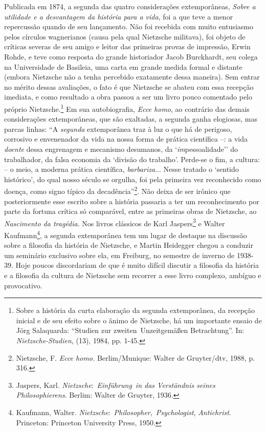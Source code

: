 \label{introduuxe7uxe3o}

Publicada em 1874, a segunda das quatro considerações extemporâneas,
\emph{Sobre a utilidade e a desvantagem da história para a vida}, foi a
que teve a menor repercussão quando de seu lançamento. Não foi recebida
com muito entusiasmo pelos círculos wagnerianos (causa pela qual
Nietzsche militava), foi objeto de críticas severas de seu amigo e
leitor das primeiras provas de impressão, Erwin Rohde, e teve como
resposta do grande historiador Jacob Burckhardt, seu colega na
Universidade de Basileia, uma carta em grande medida formal e distante
(embora Nietzsche não a tenha percebido exatamente dessa maneira). Sem
entrar no mérito dessas avaliações, o fato é que Nietzsche se abateu com
essa recepção imediata, e como resultado a obra passou a ser um livro
pouco comentado pelo próprio Nietzsche.\footnote{Sobre a história da
  curta elaboração da segunda extemporânea, da recepção inicial e de seu
  efeito sobre o ânimo de Nietzsche, há um importante ensaio de Jörg
  Salaquarda: ``Studien zur zweiten~Unzeitgemäßen Betrachtung''. In:
  \emph{Nietzsche-Studien}, (13), 1984, pp. 1-45.} Em sua autobiografia,
\emph{Ecce homo}, ao contrário das demais considerações extemporâneas,
que são exaltadas, a segunda ganha elogiosas, mas parcas linhas: ``A
\emph{segunda} extemporânea traz à luz o que há de perigoso, corrosivo e
envenenador da vida na nossa forma de prática científica --: a vida
\emph{doente} dessa engrenagem e mecanismo desumanos, da
`\emph{im}pessoalidade'' do trabalhador, da falsa economia da `divisão
do trabalho'. Perde-se o fim, a cultura: -- o meio, a moderna prática
científica, \emph{barbariza}... Nesse tratado o `sentido histórico', do
qual nosso século se orgulha, foi pela primeira vez reconhecido como
doença, como signo típico da decadência''\footnote{Nietzsche, F.
  \emph{Ecce homo.} Berlim/Munique: Walter de Gruyter/dtv, 1988, p. 316.}.
Não deixa de ser irônico que posteriormente esse escrito sobre a
história passaria a ter um reconhecimento por parte da fortuna crítica
só comparável, entre as primeiras obras de Nietzsche, ao
\emph{Nascimento da tragédia}. Nos livros clássicos de Karl
Jaspers\footnote{Jaspers, Karl.
  \emph{Nietzsche}:~\emph{Einführung}~\emph{in das Verständnis seines
  Philosophierens}. Berlim: Walter de Gruyter, 1936.} e Walter
Kaufmann\footnote{Kaufmann, Walter.
  \emph{Nietzsche}:~\emph{Philosopher},~\emph{Psychologist},
  \emph{Antichrist}. Princeton: Princeton University Press, 1950.}, a
segunda extemporânea tem um lugar de destaque na discussão sobre a
filosofia da história de Nietzsche, e Martin Heidegger chegou a conduzir
um seminário exclusivo sobre ela, em Freiburg, no semestre de inverno de
1938-39. Hoje poucos discordariam de que é muito difícil discutir a
filosofia da história e a filosofia da cultura de Nietzsche sem recorrer
a esse livro complexo, ambíguo e provocativo.

